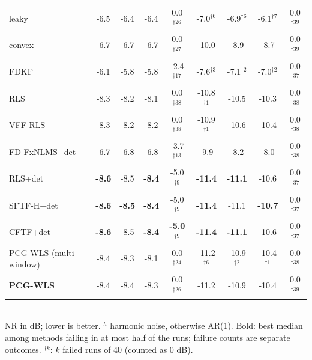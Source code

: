 \begin{table}[t]
{\begin{tabular}{lcccccccc}
leaky & -6.5 & -6.4 & -6.4 & 0.0$^{\dagger26}$ & -7.0$^{\dagger6}$ & -6.9$^{\dagger6}$ & -6.1$^{\dagger7}$ & 0.0$^{\dagger39}$ \\
convex & -6.7 & -6.7 & -6.7 & 0.0$^{\dagger27}$ & -10.0 & -8.9 & -8.7 & 0.0$^{\dagger39}$ \\
FDKF & -6.1 & -5.8 & -5.8 & -2.4$^{\dagger17}$ & -7.6$^{\dagger3}$ & -7.1$^{\dagger2}$ & -7.0$^{\dagger2}$ & 0.0$^{\dagger37}$ \\
RLS & -8.3 & -8.2 & -8.1 & 0.0$^{\dagger38}$ & -10.8$^{\dagger1}$ & -10.5 & -10.3 & 0.0$^{\dagger38}$ \\
VFF-RLS & -8.3 & -8.2 & -8.2 & 0.0$^{\dagger38}$ & -10.9$^{\dagger1}$ & -10.6 & -10.4 & 0.0$^{\dagger38}$ \\
FD-FxNLMS+det & -6.7 & -6.8 & -6.8 & -3.7$^{\dagger13}$ & -9.9 & -8.2 & -8.0 & 0.0$^{\dagger38}$ \\
RLS+det & \textbf{-8.6} & -8.5 & \textbf{-8.4} & -5.0$^{\dagger9}$ & \textbf{-11.4} & \textbf{-11.1} & -10.6 & 0.0$^{\dagger37}$ \\
SFTF-H+det & \textbf{-8.6} & \textbf{-8.5} & \textbf{-8.4} & -5.0$^{\dagger9}$ & \textbf{-11.4} & -11.1 & \textbf{-10.7} & 0.0$^{\dagger37}$ \\
CFTF+det & \textbf{-8.6} & -8.5 & \textbf{-8.4} & \textbf{-5.0$^{\dagger9}$} & \textbf{-11.4} & \textbf{-11.1} & -10.6 & 0.0$^{\dagger37}$ \\
PCG-WLS (multi-window) & -8.4 & -8.3 & -8.1 & 0.0$^{\dagger24}$ & -11.2$^{\dagger6}$ & -10.9$^{\dagger2}$ & -10.4$^{\dagger1}$ & 0.0$^{\dagger38}$ \\
\textbf{PCG-WLS} & -8.4 & -8.4 & -8.3 & 0.0$^{\dagger26}$ & -11.2 & -10.9 & -10.4 & 0.0$^{\dagger39}$ \\
\bottomrule
\end{tabular}}
\\[2pt]{\scriptsize NR in dB; lower is better. $^h$ harmonic noise, otherwise AR(1). Bold: best median among methods failing in at most half of the runs; failure counts are separate outcomes. $^{\dagger k}$: $k$ failed runs of 40 (counted as 0 dB).}
\end{table}

